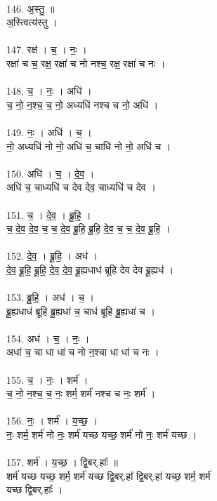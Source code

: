 \\
146. अ॒स्तु॒ ॥\\
अ॒स्त्वित्य॑स्तु ।\\
\\
147. रक्ष॑ । च॒ । नः॒ ।\\
रक्षा॑ च च॒ रक्ष॒ रक्षा॑ च नो नश्च॒ रक्ष॒ रक्षा॑ च नः ।\\
\\
148. च॒ । नः॒ । अधि॑ ।\\
च॒ नो॒ न॒श्च॒ च॒ नो॒ अध्यधि॑ नश्च च नो॒ अधि॑ ।\\
\\
149. नः॒ । अधि॑ । च॒ ।\\
नो॒ अध्यधि॑ नो नो॒ अधि॑ च॒ चाधि॑ नो नो॒ अधि॑ च ।\\
\\
150. अधि॑ । च॒ । दे॒व॒ ।\\
अधि॑ च॒ चाध्यधि॑ च देव देव॒ चाध्यधि॑ च देव ।\\
\\
151. च॒ । दे॒व॒ । ब्रू॒हि॒ ।\\
च॒ दे॒व॒ दे॒व॒ च॒ च॒ दे॒व॒ ब्रू॒हि॒ ब्रू॒हि॒ दे॒व॒ च॒ च॒ दे॒व॒ ब्रू॒हि॒ ।\\
\\
152. दे॒व॒ । ब्रू॒हि॒ । अध॑ ।\\
दे॒व॒ ब्रू॒हि॒ ब्रू॒हि॒ दे॒व॒ दे॒व॒ ब्रू॒ह्यधाध॑ ब्रूहि देव देव ब्रू॒ह्यध॑ ।\\
\\
153. ब्रू॒हि॒ । अध॑ । च॒ ।\\
ब्रू॒ह्यधाध॑ ब्रूहि ब्रू॒ह्यधा॑ च॒ चाध॑ ब्रूहि ब्रू॒ह्यधा॑ च ।\\
\\
154. अध॑ । च॒ । नः॒ ।\\
अधा॑ च॒ चा धा धा॑ च नो न॒श्चा धा धा॑ च नः ।\\
\\
155. च॒ । नः॒ । शर्म॑ ।\\
च॒ नो॒ न॒श्च॒ च॒ नः॒ शर्म॒ शर्म॑ नश्च च नः॒ शर्म॑ ।\\
\\
156. नः॒ । शर्म॑ । य॒च्छ॒ ।\\
नः॒ शर्म॒ शर्म॑ नो नः॒ शर्म॑ यच्छ यच्छ॒ शर्म॑ नो नः॒ शर्म॑ यच्छ ।\\
\\
157. शर्म॑ । य॒च्छ॒ । द्वि॒बर्.हाः᳚ ॥\\
शर्म॑ यच्छ यच्छ॒ शर्म॒ शर्म॑ यच्छ द्वि॒बर्.हा᳚ द्वि॒बर्.हा॑ यच्छ॒ शर्म॒ शर्म॑\\
यच्छ द्वि॒बर्.हाः᳚ ।\\
\\
